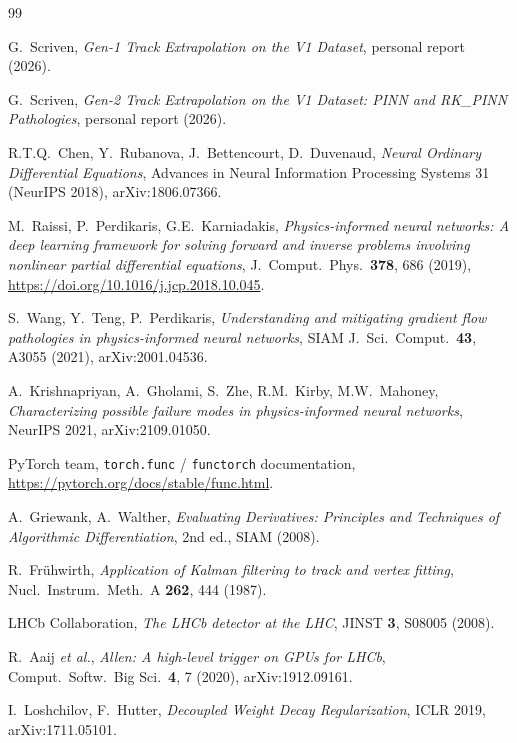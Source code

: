 \documentclass[a4paper,11pt]{article}
\newcommand{\dz}{\Delta z}
\begin{document}
\begin{thebibliography}{99}

G.~Scriven, \emph{Gen-1 Track Extrapolation on the V1 Dataset},
personal report (2026).

G.~Scriven, \emph{Gen-2 Track Extrapolation on the V1 Dataset: PINN
and RK\_PINN Pathologies}, personal report (2026).

R.T.Q.~Chen, Y.~Rubanova, J.~Bettencourt, D.~Duvenaud,
\emph{Neural Ordinary Differential Equations},
Advances in Neural Information Processing Systems 31 (NeurIPS 2018),
arXiv:1806.07366.

M.~Raissi, P.~Perdikaris, G.E.~Karniadakis,
\emph{Physics-informed neural networks: A deep learning framework for
solving forward and inverse problems involving nonlinear partial
differential equations}, J.\ Comput.\ Phys.\ \textbf{378}, 686 (2019),
\url{https://doi.org/10.1016/j.jcp.2018.10.045}.

S.~Wang, Y.~Teng, P.~Perdikaris,
\emph{Understanding and mitigating gradient flow pathologies in
physics-informed neural networks}, SIAM J.\ Sci.\ Comput.\
\textbf{43}, A3055 (2021), arXiv:2001.04536.

A.~Krishnapriyan, A.~Gholami, S.~Zhe, R.M.~Kirby, M.W.~Mahoney,
\emph{Characterizing possible failure modes in physics-informed
neural networks}, NeurIPS 2021, arXiv:2109.01050.

PyTorch team, \texttt{torch.func} / \texttt{functorch} documentation,
\url{https://pytorch.org/docs/stable/func.html}.

A.~Griewank, A.~Walther,
\emph{Evaluating Derivatives: Principles and Techniques of
Algorithmic Differentiation}, 2nd ed., SIAM (2008).

R.~Fr\"uhwirth,
\emph{Application of Kalman filtering to track and vertex fitting},
Nucl.\ Instrum.\ Meth.\ A \textbf{262}, 444 (1987).

LHCb Collaboration,
\emph{The LHCb detector at the LHC}, JINST \textbf{3}, S08005 (2008).

R.~Aaij \emph{et al.},
\emph{Allen: A high-level trigger on GPUs for LHCb},
Comput.\ Softw.\ Big Sci.\ \textbf{4}, 7 (2020), arXiv:1912.09161.

I.~Loshchilov, F.~Hutter,
\emph{Decoupled Weight Decay Regularization}, ICLR 2019,
arXiv:1711.05101.

\end{thebibliography}

\end{document}

